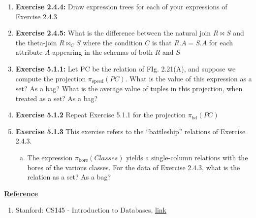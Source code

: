 \documentclass[12pt]{article}
\begin{document}
\begin{enumerate}[1.]
    \item \textbf{Exercise 2.4.4:} Draw expression trees for each of your expressions of
    Exercise 2.4.3

    \item \textbf{Exercise 2.4.5:} What is the difference between the natural join $R \bowtie S$ and the
    theta-join $R \bowtie_C S$ where the condition $C$ is that $R.A = S.A$ for
    each attribute $A$ appearing in the schemas of both $R$ and $S$

    \item \textbf{Exercise 5.1.1:} Let PC be the relation of FIg. 2.21(A), and suppose
    we compute the projection $\pi_{\text{speed}}(PC)$. What is the value of this
    expression as a set? As a bag? What is the average value of tuples in this projection,
    when treated as a set? As a bag?

    \item \textbf{Exercise 5.1.2} Repeat Exercise 5.1.1 for the projection $\pi_{\text{hd}}(PC)$

    \item \textbf{Exercise 5.1.3} This exercise refers to the ``battleship'' relations
    of Exercise 2.4.3.

    \bigskip

    \begin{enumerate}[a)]
        \item The expression $\pi_{\text{bore}}(Classes)$ yields a single-column
        relations with the bores of the various classes. For the data of Exercise 2.4.3,
        what is the relation as a set? As a bag?
    \end{enumerate}
\end{enumerate}

\bigskip

\underline{\textbf{Reference}}

\bigskip

\begin{enumerate}[1)]
    \item Stanford: CS145 - Introduction to Databases, \href{http://infolab.stanford.edu/~ullman/fcdb/aut07/index.html}{link}
\end{enumerate}
\end{document}
